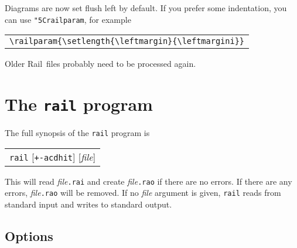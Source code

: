 \documentclass[a4paper]{article}
\newcommand\Rail{Rail}
\newcommand\nt[1]{\textit{#1}}
\newcommand\file[1]{\textit{file}\texttt{.#1}}
\newcommand\lit[1]{\texttt{#1}}
\newcommand\cs[1]{\lit{\char"5C\relax#1}}
\newenvironment{example}%
{\begin{trivlist}\item[]\begin{tabular}{l}}%
{\end{tabular}\end{trivlist}}
\begin{document}
Diagrams are now set flush left by default. If you prefer some indentation, you
can use \cs{railparam}, for example
\begin{example}
\verb!\railparam{\setlength{\leftmargin}{\leftmargini}}!
\end{example}

Older \Rail\ files probably need to be processed again.

\section{The \texttt{rail} program}

The full synopsis of the \lit{rail} program is
\begin{example}
\lit{rail} [\lit{+-acdhit}] [\nt{file}]
\end{example}
This will read \file{rai} and create \file{rao} if there are no errors.
If there are any errors, \file{rao} will be removed. If no \nt{file}
argument is given, \lit{rail} reads from standard input and writes to
standard output.

\subsection{Options}\label{sec:options}
\end{document}
